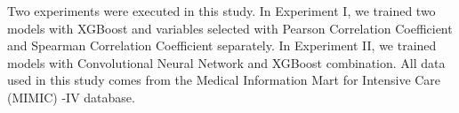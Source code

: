 \documentclass[12pt,a4paper,english
]{tunithesis}
\begin{document}


Two experiments were executed in this study. In Experiment I, we trained two models with XGBoost and variables selected with Pearson Correlation Coefficient and Spearman Correlation Coefficient separately. In Experiment II, we trained models with Convolutional Neural Network and XGBoost combination. All data used in this study comes from the Medical Information Mart for Intensive Care (MIMIC) -IV database.
\end{document}
